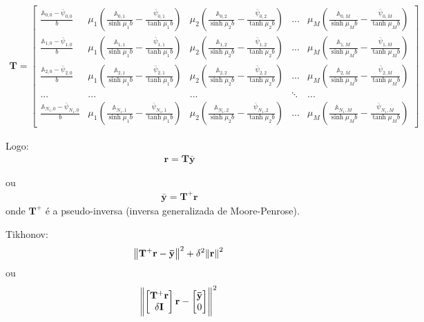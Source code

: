 \begin{align}
\mathbf{T} = 
\begin{bmatrix}
\frac{\mathbb{A}_{0,0} - \bar{\psi}_{0,0}}{b} & \scriptstyle\mu_1 \left(\frac{\mathbb{A}_{0,1}}{\sinh\mu_1 b} - \frac{\bar{\psi}_{0, 1}}{\tanh\mu_1 b}\right) & \scriptstyle\mu_2 \left(\frac{\mathbb{A}_{0,2}}{\sinh\mu_2 b} - \frac{\bar{\psi}_{0, 2}}{\tanh\mu_2 b}\right) & ... & \scriptstyle\mu_M \left(\frac{\mathbb{A}_{0,M}}{\sinh\mu_M b} - \frac{\bar{\psi}_{0, M}}{\tanh\mu_M b}\right) \\
%
\frac{\mathbb{A}_{1,0} - \bar{\psi}_{1,0}}{b} & \scriptstyle\mu_1 \left(\frac{\mathbb{A}_{1,1}}{\sinh\mu_1 b} - \frac{\bar{\psi}_{1, 1}}{\tanh\mu_1 b}\right) & \scriptstyle\mu_2 \left(\frac{\mathbb{A}_{1,2}}{\sinh\mu_2 b} - \frac{\bar{\psi}_{1, 2}}{\tanh\mu_2 b}\right) & ... & \scriptstyle\mu_M \left(\frac{\mathbb{A}_{1,M}}{\sinh\mu_M b} - \frac{\bar{\psi}_{1, M}}{\tanh\mu_M b}\right) \\
%
\frac{\mathbb{A}_{2,0} - \bar{\psi}_{2,0}}{b} & \scriptstyle\mu_1 \left(\frac{\mathbb{A}_{2,1}}{\sinh\mu_1 b} - \frac{\bar{\psi}_{2, 1}}{\tanh\mu_1 b}\right) & \scriptstyle\mu_2 \left(\frac{\mathbb{A}_{2,2}}{\sinh\mu_2 b} - \frac{\bar{\psi}_{2, 2}}{\tanh\mu_2 b}\right) & ... & \scriptstyle\mu_M \left(\frac{\mathbb{A}_{2,M}}{\sinh\mu_M b} - \frac{\bar{\psi}_{2, M}}{\tanh\mu_M b}\right) \\
%
... & ... & ... & \ddots & ... \\
%
%
\frac{\mathbb{A}_{N_1,0} - \bar{\psi}_{N_1,0}}{b} & \scriptstyle\mu_1 \left(\frac{\mathbb{A}_{N_1,1}}{\sinh\mu_1 b} - \frac{\bar{\psi}_{N_1, 1}}{\tanh\mu_1 b}\right) & \scriptstyle\mu_2 \left(\frac{\mathbb{A}_{N_1,2}}{\sinh\mu_2 b} - \frac{\bar{\psi}_{N_1, 2}}{\tanh\mu_2 b}\right) & ... & \scriptstyle\mu_M \left(\frac{\mathbb{A}_{N_1,M}}{\sinh\mu_M b} - \frac{\bar{\psi}_{N_1, M}}{\tanh\mu_M b}\right)
\end{bmatrix}
\end{align}

Logo:
\begin{align}
\mathbf{r} = \mathbf{T}\mathbf{\bar{y}}
\end{align}

ou
\begin{align}
\mathbf{\bar{y}} = \mathbf{T}^{+}\mathbf{r}
\end{align}
onde $\mathbf{T}^{+}$ é a pseudo-inversa (inversa generalizada de Moore-Penrose).

Tikhonov:
\begin{align}
\norm{\mathbf{T}^{+}\mathbf{r} - \mathbf{\bar{y}}}^2 + \delta^2\norm{\mathbf{r}}^2
\end{align}
ou
\begin{align}
\norm{
\begin{bmatrix}
\mathbf{T}^{+}\mathbf{r} \\ \delta\mathbf{I}
\end{bmatrix}
\mathbf{r}
-
\begin{bmatrix}
\mathbf{\bar{y}} \\ 0
\end{bmatrix}
}^2
\end{align}